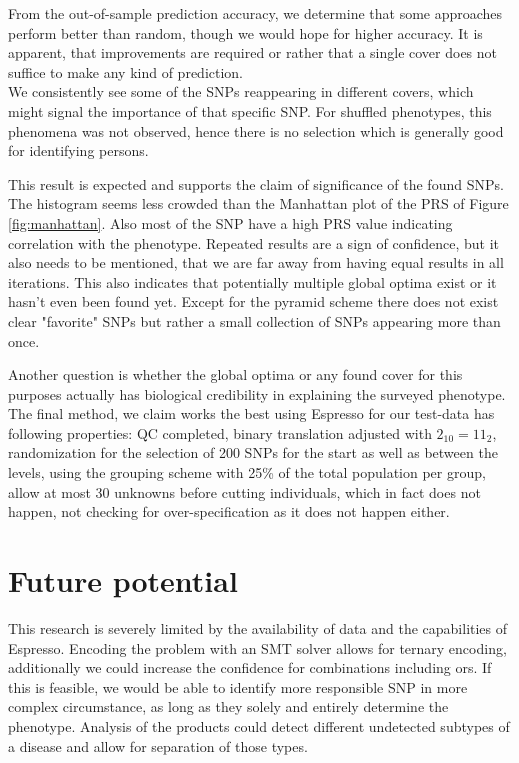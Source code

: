 \documentclass[letterpaper, 11pt]{article}
\begin{document}
From the out-of-sample prediction accuracy, we determine that some approaches perform better than random, though we would hope for higher accuracy. It is apparent, that improvements are required or rather that a single cover does not suffice to make any kind of prediction.\\

We consistently see some of the SNPs reappearing in different covers, which might signal the importance of that specific SNP. For shuffled phenotypes, this phenomena was not observed, hence there is no selection which is generally good for identifying persons. 

This result is expected and supports the claim of significance of the found SNPs.\\

The histogram seems less crowded than the Manhattan plot of the PRS of Figure \ref{fig:manhattan}. Also most of the SNP have a high PRS value indicating correlation with the phenotype. Repeated results are a sign of confidence, but it also needs to be mentioned, that we are far away from having equal results in all iterations. This also indicates that potentially multiple global optima exist or it hasn't even been found yet.  Except for  the pyramid scheme there does not exist clear "favorite" SNPs but rather a small collection of SNPs appearing more than once.

Another question is whether the global optima or any found cover for this purposes actually has biological credibility in explaining the surveyed phenotype. \\

The final method, we claim works the best using Espresso for our test-data has following properties: QC completed, binary translation adjusted with $2_{10}=11_2$, randomization for the selection of 200 SNPs for the start as well as between the levels, using the grouping scheme with 25\% of the total population per group, allow at most 30 unknowns before cutting individuals, which in fact does not happen, not checking for over-specification as it does not happen either. 
\section{Future potential}%
This research is severely limited by the availability of data and the capabilities of Espresso. Encoding the problem with an SMT solver allows for ternary encoding, additionally we could increase the confidence for combinations including ors. If this is feasible, we would be able to identify more responsible SNP in more complex circumstance, as long as they solely and entirely determine the phenotype. Analysis of the products could detect different undetected subtypes of a disease and allow for separation of those types.  \\
\end{document}
